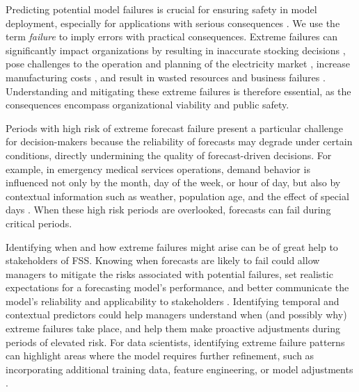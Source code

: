 \documentclass[preprint,12pt]{elsarticle}
\begin{document}
Predicting potential model failures is crucial for ensuring safety in model deployment, especially for applications with serious consequences \citep{tsiligkaridis2021}. We use the term \emph{failure} to imply errors with practical consequences. Extreme failures can significantly impact organizations by resulting in inaccurate stocking decisions \citep{boylan2021}, pose challenges to the operation and planning of the electricity market \citep{zhu2025}, increase manufacturing costs \citep{sanders2009}, and result in wasted resources and business failures \citep{chae2024}. Understanding and mitigating these extreme failures is therefore essential, as the consequences encompass organizational viability and public safety.

Periods with high risk of extreme forecast failure present a particular challenge for decision-makers because the reliability of forecasts may degrade under certain conditions, directly undermining the quality of forecast-driven decisions. For example, in emergency medical services operations, demand behavior is influenced not only by the month, day of the week, or hour of  day, but also by contextual information such as weather, population age, and the effect of special days \citep{abreu2023}. When these high risk periods are overlooked, forecasts can fail during critical periods.

Identifying when and how extreme failures might arise can be of great help to stakeholders of FSS. Knowing when forecasts are likely to fail could allow managers to mitigate the risks associated with potential failures, set realistic expectations for a forecasting model's performance, and better communicate the model's reliability and applicability to stakeholders \citep{cakmak2024}. Identifying temporal and contextual predictors could help managers understand when (and possibly why) extreme failures take place, and help them make proactive adjustments during periods of elevated risk. For data scientists, identifying extreme failure patterns can highlight areas where the model requires further refinement, such as incorporating additional training data, feature engineering, or model adjustments \citep{cakmak2024}. 
\end{document}
